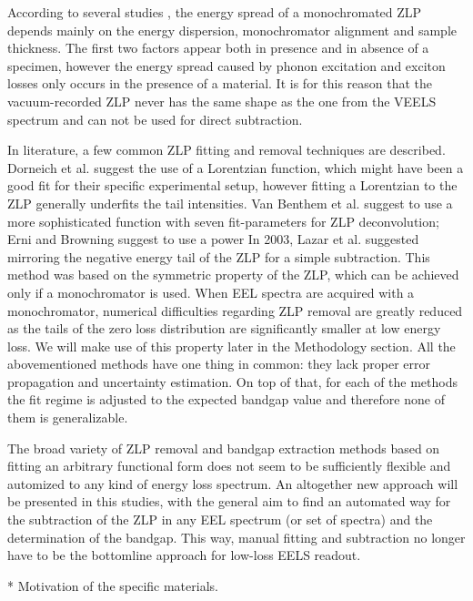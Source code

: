  According to several studies \cite{Park:2008, Stoger:2008}, the energy spread of a monochromated ZLP depends mainly on the energy dispersion, monochromator alignment and sample thickness. The first two factors appear both in presence and in absence of a specimen, however the energy spread caused by phonon excitation and exciton losses only occurs in the presence of a material. It is for this reason that the vacuum-recorded ZLP never has the same shape as the one from the VEELS spectrum and can not be used for direct subtraction.
 
In literature, a few common ZLP fitting and removal techniques are described. Dorneich et al. \cite{Dorneich:1998} suggest the use of a Lorentzian function, which might have been a good fit for their specific experimental setup, however fitting a Lorentzian to the ZLP generally underfits the tail intensities. Van Benthem et al. \cite{Benthem:2001} suggest to use a more sophisticated function with seven fit-parameters for ZLP deconvolution; Erni and Browning \cite{Erni:2005} suggest to use a power 
In 2003, Lazar et al. \cite{Lazar:2003} suggested mirroring the negative energy tail of the ZLP for a simple subtraction. This method was based on the symmetric property of the ZLP, which can be achieved only if a monochromator is used. When EEL spectra are acquired with a monochromator, numerical difficulties regarding ZLP removal are greatly reduced as the tails of the zero loss distribution are significantly smaller at low energy loss. We will make use of this property later in the Methodology section.
All the abovementioned methods have one thing in common: they lack proper error propagation and uncertainty estimation. On top of that, for each of the methods the fit regime is adjusted to the expected bandgap value and therefore none of them is generalizable. 

The broad variety of ZLP removal and bandgap extraction methods based on fitting an arbitrary functional form does not seem to be sufficiently flexible and automized to any kind of energy loss spectrum. An altogether new approach will be presented in this studies, with the general aim to find an automated way for the subtraction of the ZLP in any EEL spectrum (or set of spectra) and the determination of the bandgap. This way, manual fitting and subtraction no longer have to be the bottomline approach for low-loss EELS readout. 

* Motivation of the specific materials.




